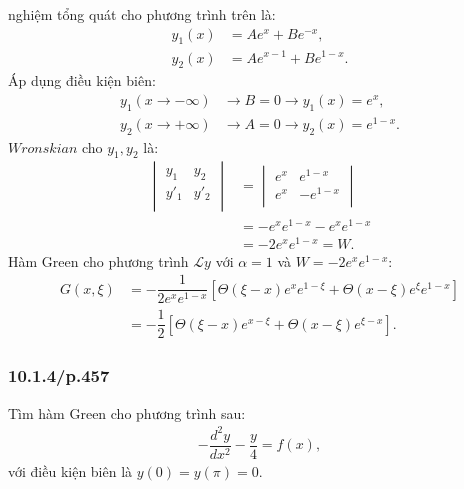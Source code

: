 \documentclass{report}
\newcommand{\f}[2]{\dfrac{#1}{#2}}
\begin{document}
\begin{enumerate}[label=(\alph*)]
	      nghiệm tổng quát cho phương trình trên là:
	      \begin{align*}
		      y_1(x) & = A e^{x} + B e^{-x},    \\
		      y_2(x) & = A e^{x-1} + B e^{1-x}.
	      \end{align*}
	      Áp dụng điều kiện biên:
	      \begin{align*}
		      y_1(x\rightarrow - \infty) & \rightarrow B = 0 \rightarrow y_1(x) = e^{x}  ,  \\
		      y_2(x\rightarrow + \infty) & \rightarrow A = 0 \rightarrow y_2(x) = e^{1-x} .
	      \end{align*}
	      $Wronskian$ cho $y_1,y_2$ là:
	      \begin{align*}
		      \begin{vmatrix}
			      y_1  & y_2  \\
			      y'_1 & y'_2 \\
		      \end{vmatrix}
		       & =
		      \begin{vmatrix}
			      e^{x} & e^{1-x}  \\
			      e^{x} & -e^{1-x} \\
		      \end{vmatrix}                     \\
		       & = - e^{x} e^{1-x} - e^{x} e^{1-x} \\
		       & = -2 e^{x} e^{1-x} = W.
	      \end{align*}
	      Hàm Green cho phương trình $\mathcal{L} y$ với $\alpha = 1$ và $W = -2 e^{x} e^{1-x}$:
	      \begin{align*}
		      G(x,\xi)
		       & = -\f{1}{2 e^{x} e^{1-x}} \left[ \Theta(\xi - x) e^{x} e^{1-\xi} + \Theta(x - \xi) e^{\xi} e^{1-x} \right] \\
		       & = -\f{1}{2} \left[ \Theta(\xi - x) e^{x-\xi} + \Theta(x - \xi) e^{\xi - x} \right].
	      \end{align*}
\end{enumerate}
\subsubsection{10.1.4/p.457}
Tìm hàm Green cho phương trình sau:
\begin{align*}
	-\dfrac{d^2 y}{dx^2} - \dfrac{y}{4} = f(x),
\end{align*}
với điều kiện biên là $y(0) = y(\pi) = 0$. \\
\end{document}
